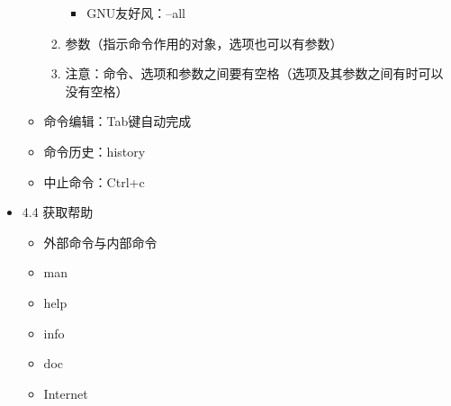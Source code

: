 \documentclass[bigger]{beamer}
\begin{document}
\begin{frame}[fragile]
\begin{itemize}
\begin{itemize}
\begin{enumerate}
\begin{itemize}
\begin{itemize}
\end{itemize}
\item GNU友好风：--all
\end{itemize}
\item 参数（指示命令作用的对象，选项也可以有参数）
\item 注意：命令、选项和参数之间要有空格（选项及其参数之间有时可以没有空格）
\end{enumerate}
\item 命令编辑：Tab键自动完成
\item 命令历史：history
\item 中止命令：Ctrl+c
\end{itemize}

\item 4.4 获取帮助
\label{sec-1-4-4}%
\begin{itemize}
\item 外部命令与内部命令
\item man
\item help
\item info
\item doc
\item Internet
\end{itemize}
\end{itemize} %
\end{frame}
\end{document}
